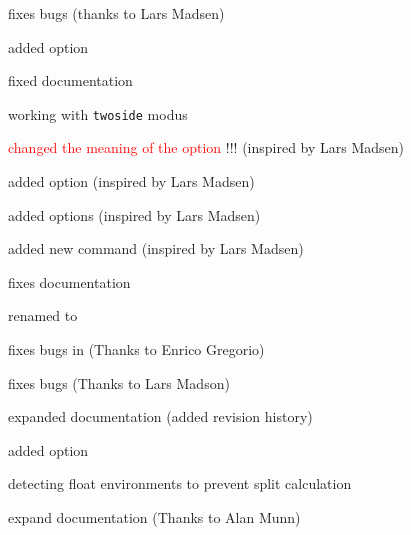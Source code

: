 \documentclass[parskip=false,english,11pt]{ltxmdf}
\begin{document}
\begin{itemize*}
\item fixes bugs (thanks to Lars Madsen)
\item added option 
\item fixed documentation
\end{itemize*}


\begin{itemize*}
\item working with \texttt{twoside} modus
\end{itemize*}

\begin{itemize*}
\item \textcolor{red}{changed the meaning of the option }!!! (inspired by Lars Madsen)
\item added option  (inspired by Lars Madsen)
\item added options  (inspired by Lars Madsen)
\item added new command  (inspired by Lars Madsen)
\item fixes documentation
\item renamed  to 
\end{itemize*}



\begin{itemize*}
\item fixes bugs in  (Thanks to Enrico Gregorio)
\end{itemize*}

\begin{itemize*}
\item fixes bugs (Thanks to Lars Madson)
\item expanded documentation (added revision history)
\end{itemize*}


\begin{itemize*}
\item added option 
\item detecting float environments to prevent split calculation
\item expand documentation (Thanks to Alan Munn)
\end{itemize*}
\end{document}
